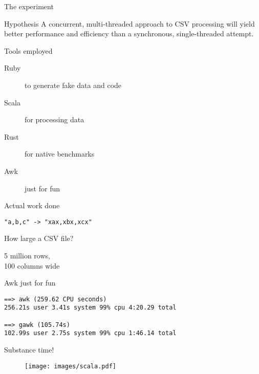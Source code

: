 \documentclass[aspectratio=169,14pt]{beamer}
\newcommand{\megatext}[1]{
  \begin{center}
    \Huge
    #1
  \end{center}
}
\newcommand{\bigtext}[1]{
  \begin{center}
    \Large
    #1
  \end{center}
}
\begin{document}
\begin{frame}{The experiment}
  \begin{block}{Hypothesis}
    A concurrent, multi-threaded approach to CSV processing will yield better performance and efficiency than a synchronous, single-threaded attempt.
  \end{block}

  \begin{block}{Tools employed}
    \begin{description}
    \item[Ruby] to generate fake data and code
    \item[Scala] for processing data
    \item[Rust] for native benchmarks
    \item[Awk] just for fun
    \end{description}
  \end{block}
\end{frame}


\begin{frame}{Actual work done}
  \bigtext{\texttt{"a,b,c" -> "xax,xbx,xcx"}}
\end{frame}

\begin{frame}{How large a CSV file?}
  \megatext{5 million rows,\\100 columns wide}
\end{frame}

\begin{frame}[fragile]{Awk just for fun}
  \begin{verbatim}
==> awk (259.62 CPU seconds)
256.21s user 3.41s system 99% cpu 4:20.29 total

==> gawk (105.74s)
102.99s user 2.75s system 99% cpu 1:46.14 total
  \end{verbatim}
\end{frame}

\begin{frame}
  \megatext{Substance time!}
\end{frame}

\begin{frame}
  \begin{figure}
    \texttt{[image: images/scala.pdf]}
  \end{figure}
\end{frame}
\end{document}

